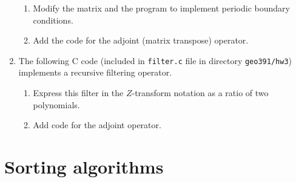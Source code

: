 \begin{enumerate}
\begin{enumerate}
\item Modify the matrix and the program to implement periodic boundary conditions.
\item Add the code for the adjoint (matrix transpose) operator.
\end{enumerate}

\item The following C code (included in \texttt{filter.c} file in
  directory \texttt{geo391/hw3}) implements a recursive filtering
  operator.

\lstset{language=c,numbers=left,numberstyle=\tiny,showstringspaces=false}


\begin{enumerate}
\item Express this filter in the $Z$-transform notation as a ratio
  of two polynomials.
\item Add code for the adjoint operator.
\end{enumerate}

\end{enumerate}

\section{Sorting algorithms}

